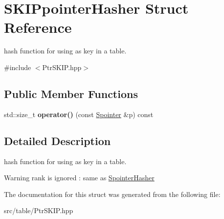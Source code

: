 \hypertarget{structSKIPpointerHasher}{}\section{S\+K\+I\+Ppointer\+Hasher Struct Reference}
\label{structSKIPpointerHasher}


hash function for using as key in a table.  




{\ttfamily \#include $<$Ptr\+S\+K\+I\+P.\+hpp$>$}

\subsection*{Public Member Functions}
\begin{DoxyCompactItemize}
\item 
\mbox{\label{structSKIPpointerHasher_a5bab704b8e284d8922465e170953e3f2}} 
std\+::size\+\_\+t {\bfseries operator()} (const \mbox{\hyperlink{classSpointer}{Spointer}} \&p) const
\end{DoxyCompactItemize}


\subsection{Detailed Description}
hash function for using as key in a table. 

\begin{DoxyWarning}{Warning}
rank is ignored \+: same as \mbox{\hyperlink{structSpointerHasher}{Spointer\+Hasher}} 
\end{DoxyWarning}


The documentation for this struct was generated from the following file\+:\begin{DoxyCompactItemize}
\item 
src/table/Ptr\+S\+K\+I\+P.\+hpp\end{DoxyCompactItemize}
